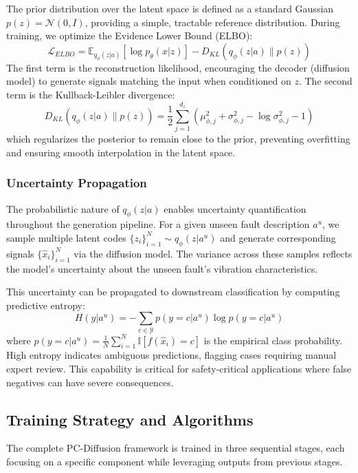 \documentclass[journal]{IEEEtran}
\begin{document}
The prior distribution over the latent space is defined as a standard Gaussian $p(z) = \mathcal{N}(0, I)$, providing a simple, tractable reference distribution. During training, we optimize the Evidence Lower Bound (ELBO):
\begin{equation}
    \mathcal{L}_{ELBO} = \mathbb{E}_{q_\phi(z|a)} [\log p_\theta(x|z)] - D_{KL}(q_\phi(z|a) \| p(z))
    \label{eq:elbo}
\end{equation}
The first term is the reconstruction likelihood, encouraging the decoder (diffusion model) to generate signals matching the input when conditioned on $z$. The second term is the Kullback-Leibler divergence:
\begin{equation}
    D_{KL}(q_\phi(z|a) \| p(z)) = \frac{1}{2} \sum_{j=1}^{d_z} \left( \mu_{\phi,j}^2 + \sigma_{\phi,j}^2 - \log \sigma_{\phi,j}^2 - 1 \right)
    \label{eq:kl_divergence}
\end{equation}
which regularizes the posterior to remain close to the prior, preventing overfitting and ensuring smooth interpolation in the latent space.

\subsubsection{Uncertainty Propagation}
The probabilistic nature of $q_\phi(z|a)$ enables uncertainty quantification throughout the generation pipeline. For a given unseen fault description $a^u$, we sample multiple latent codes $\{z_i\}_{i=1}^N \sim q_\phi(z|a^u)$ and generate corresponding signals $\{\hat{x}_i\}_{i=1}^N$ via the diffusion model. The variance across these samples reflects the model's uncertainty about the unseen fault's vibration characteristics.

This uncertainty can be propagated to downstream classification by computing predictive entropy:
\begin{equation}
    H(y|a^u) = -\sum_{c \in \mathcal{Y}} p(y=c|a^u) \log p(y=c|a^u)
    \label{eq:predictive_entropy}
\end{equation}
where $p(y=c|a^u) = \frac{1}{N}\sum_{i=1}^N \mathbb{I}[f(\hat{x}_i) = c]$ is the empirical class probability. High entropy indicates ambiguous predictions, flagging cases requiring manual expert review. This capability is critical for safety-critical applications where false negatives can have severe consequences.

\subsection{Training Strategy and Algorithms}
The complete PC-Diffusion framework is trained in three sequential stages, each focusing on a specific component while leveraging outputs from previous stages.
\end{document}
